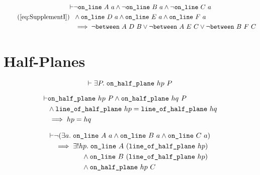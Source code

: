\begin{equation}\tag{\ref{eq:SupplementI}}
  \begin{split}
    \vdash&\neg\code{on\_line}\ A\ a \wedge \neg\code{on\_line}\ B\ a \wedge \neg\code{on\_line}\ C\ a\\
    &\wedge \code{on\_line}\ D\ a \wedge \code{on\_line}\ E\ a \wedge \code{on\_line}\ F\ a\\
    &\implies \neg\between{A}{D}{B} \vee \neg\between{A}{E}{C} \vee \neg\between{B}{F}{C}
  \end{split}
\end{equation}

\section{Half-Planes}
\begin{equation*}
  \vdash\exists P.\; \texttt{on\_half\_plane}\ hp\ P
\end{equation*}

\begin{equation*}
  \begin{split}
    \vdash&\texttt{on\_half\_plane}\ hp\ P \wedge \texttt{on\_half\_plane}\ hq\ P\\
    &\wedge\texttt{line\_of\_half\_plane}\ hp = \texttt{line\_of\_half\_plane}\ hq\\
    &\implies hp = hq
  \end{split}
\end{equation*}

\begin{equation*}
  \begin{split}
    \vdash&\neg(\exists a.\; \texttt{on\_line}\ A\ a\wedge \texttt{on\_line}\ B\ a\wedge \texttt{on\_line}\ C\ a)\\
    &\implies \exists! hp.\; \texttt{on\_line}\ A\ (\texttt{line\_of\_half\_plane}\ hp)\\
    &\qquad\qquad\wedge\texttt{on\_line}\ B\ (\texttt{line\_of\_half\_plane}\ hp)\\
    &\qquad\qquad\wedge\texttt{on\_half\_plane}\ hp\ C
\end{split}
\end{equation*}

